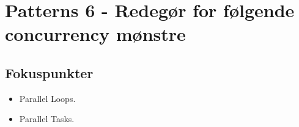 \section{Patterns 6 - Redegør for følgende concurrency mønstre}

\subsection{Fokuspunkter}

\begin{itemize}
	\item Parallel Loops.
	\item Parallel Tasks.
\end{itemize}